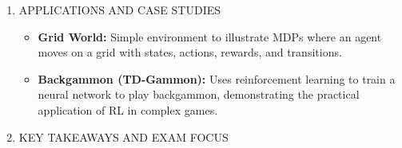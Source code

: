 \documentclass[
  12pt,
]{report}
\providecommand{\tightlist}{%
  \setlength{\itemsep}{0pt}\setlength{\parskip}{0pt}}
\begin{document}
\begin{enumerate}
  B. Algorithms and Methods:

  \begin{itemize}
  \tightlist
  \item
    \textbf{Value Iteration:}

    \begin{itemize}
    \tightlist
    \item
      Iteratively update value estimates using the Bellman equation until convergence.
    \item
      Complexity: \(O(n^2)\) per iteration for \(n\) states.
    \end{itemize}
  \item
    \textbf{Policy Iteration:}

    \begin{itemize}
    \tightlist
    \item
      Evaluate and improve policies iteratively.
    \item
      Consists of policy evaluation and policy improvement steps.
    \end{itemize}
  \item
    \textbf{Q-Learning:}

    \begin{itemize}
    \tightlist
    \item
      Off-policy learning algorithm that seeks to find the best action to take given the current state.
    \item
      Update rule:
      \[ Q(s, a) \leftarrow Q(s, a) + \alpha \left[ r + \gamma \max_{a'} Q(s', a') - Q(s, a) \right] \]
    \item
      \textbf{Epsilon-Greedy Exploration:} Choose random actions with probability \(\epsilon\) and exploitative actions with probability \(1-\epsilon\).
    \item
      Convergence: Requires visiting each state-action pair infinitely often with diminishing learning rates.
    \end{itemize}
  \end{itemize}
\item
  APPLICATIONS AND CASE STUDIES

  \begin{itemize}
  \tightlist
  \item
    \textbf{Grid World:} Simple environment to illustrate MDPs where an agent moves on a grid with states, actions, rewards, and transitions.
  \item
    \textbf{Backgammon (TD-Gammon):} Uses reinforcement learning to train a neural network to play backgammon, demonstrating the practical application of RL in complex games.
  \end{itemize}
\item
  KEY TAKEAWAYS AND EXAM FOCUS


\end{enumerate}
\end{document}
